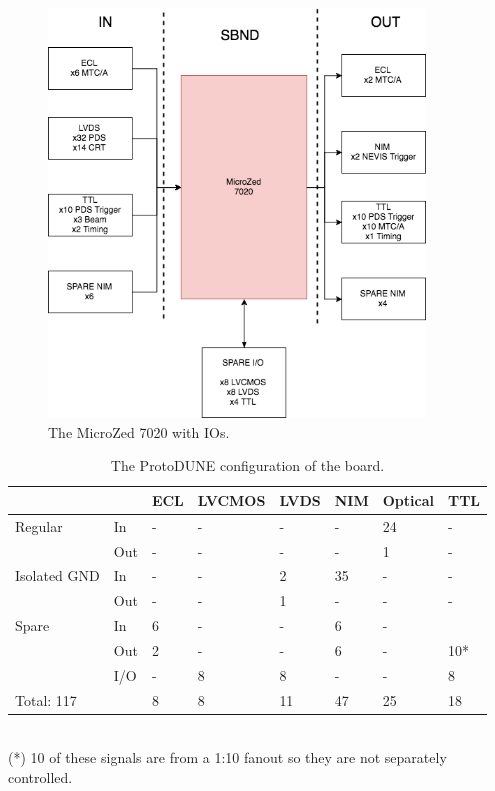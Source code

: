 \documentclass{report}
\begin{document}
 \begin{figure}[H]
     \centering
         \includegraphics[width=100mm]{ptbmk2_sbnd_io.png}
         \caption{The MicroZed 7020 with IOs.}
 \end{figure}
\begin{table}[H]
   \centering
   \caption{The ProtoDUNE configuration of the board. }
      \renewcommand{\arraystretch}{1.75}
         \begin{tabular}{llllllll}
            \toprule
                & &ECL & LVCMOS & LVDS & NIM & Optical & TTL \\
            \midrule
                Regular & In & - & - & - & - & 24 & -\\
               &Out & - & - & - & - & 1 &- \\
            \midrule
               Isolated GND & In & - & - & 2 & 35 & - & -\\
               & Out & - &  -& 1 & - & - & -\\
            \midrule
              Spare & In & 6 & -  & -  & 6 & - & \\
              & Out & 2 & - & - & 6 & - & 10*\\  
              & I/O & - & 8 & 8 & - & - & 8\\  
            \midrule
               Total: 117 & & 8 & 8 & 11 & 47 & 25 & 18 \\
            \bottomrule
         \end{tabular}
           \\ (*)     10 of these signals are from a 1:10 fanout so they are not separately controlled. 
 \end{table}
\end{document}
